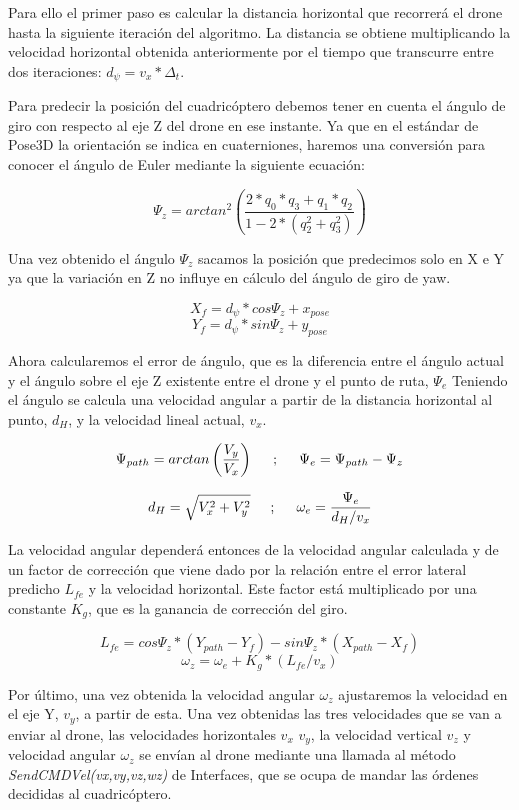 \hspace{1cm} Para ello el primer paso es calcular la distancia horizontal que recorrerá el drone hasta la siguiente iteración del algoritmo. La distancia se obtiene multiplicando la velocidad horizontal obtenida anteriormente por el tiempo que transcurre entre dos iteraciones: \(d_{\psi} = v_{x} * \Delta_{t}\).

\hspace{1cm} Para predecir la posición del cuadricóptero debemos tener en cuenta el ángulo de giro con respecto al eje Z del drone en ese instante. Ya que en el estándar de Pose3D la orientación se indica en cuaterniones, haremos una conversión para conocer el ángulo de Euler mediante la siguiente ecuación:

\[ \Psi_{z} = arctan^{2}\left( \frac{2*q_{0}*q_{3}+q_{1}*q_{2}}{1-2*(q_{2}^{2}+q_{3}^{2})}\right) \]
 
\hspace{1cm} Una vez obtenido el ángulo $\Psi_{z}$ sacamos la posición que predecimos solo en X e Y ya que la variación en Z no influye en cálculo del ángulo de giro de yaw.

\[ X_{f} = d_{\psi} * cos \Psi_{z} + x_{pose} \] 
\[ Y_{f} = d_{\psi} * sin \Psi_{z} + y_{pose} \]

\hspace{1cm} Ahora calcularemos el error de ángulo, que es la diferencia entre el ángulo actual y el ángulo sobre el eje Z existente entre el drone y el punto de ruta, $\Psi_{e}$ Teniendo el ángulo se calcula una velocidad angular a partir de la distancia horizontal al punto, $d_{H}$, y la velocidad lineal actual, $v_{x}$.
 
\[\Psi_{path} = arctan \left(\frac{V_{y}}{V_{x}}\right)  \hspace{0.5cm};\hspace{0.5cm}\Psi_{e} = \Psi_{path} - \Psi_{z} \]

\[d_{H} = \sqrt{V_{x}^{2} + V_{y}^{2}} \hspace{0.5cm};\hspace{0.5cm} \omega_{e} =  \dfrac{\Psi_{e}}{d_{H}/v_{x}}\]

\hspace{1cm} La velocidad angular dependerá entonces de la velocidad angular calculada y de un factor de corrección que viene dado por la relación entre el error lateral predicho $L_{fe}$ y la velocidad horizontal. Este factor está multiplicado por una constante $K_{g}$, que es la ganancia de corrección del giro.

\[ L_{fe} = cos\Psi_{z}*(Y_{path}-Y_{f}) - sin\Psi_{z}*(X_{path}-X_{f}) \]
\[ \omega_{z} = \omega_{e} + K_{g} * (L_{fe}/v_{x})\]

\hspace{1cm} Por último, una vez obtenida la velocidad angular $\omega_{z}$ ajustaremos la velocidad en el eje Y, $v_{y}$, a partir de esta. Una vez obtenidas las tres velocidades que se van a enviar al drone, las velocidades horizontales $v_{x}$ $v_{y}$, la velocidad vertical $v_{z}$ y velocidad angular $\omega_{z}$ se envían al drone mediante una llamada al método \textit{SendCMDVel(vx,vy,vz,wz)} de Interfaces, que se ocupa de mandar las órdenes decididas al cuadricóptero.
